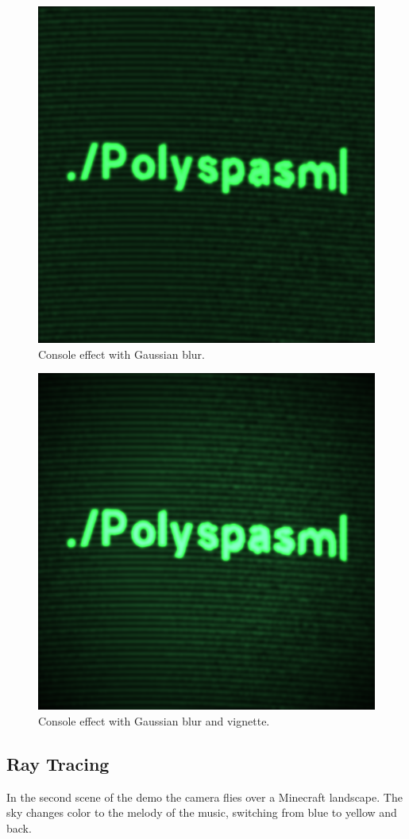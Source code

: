 \documentclass{acmsiggraph}               %
\begin{document}
\begin{figure}[H]
    \centering
    \includegraphics[width=0.7\columnwidth]{console1.png}
    \caption{Console effect with Gaussian blur.}
\end{figure}

\begin{figure}[H]
    \centering
    \includegraphics[width=0.7\columnwidth]{console2.png}
    \caption{Console effect with Gaussian blur and vignette.}
\end{figure}

\subsection{Ray Tracing}

In the second scene of the demo the camera flies over a Minecraft landscape.
The sky changes color to the melody of the music, switching from blue to
yellow and back.
\end{document}
